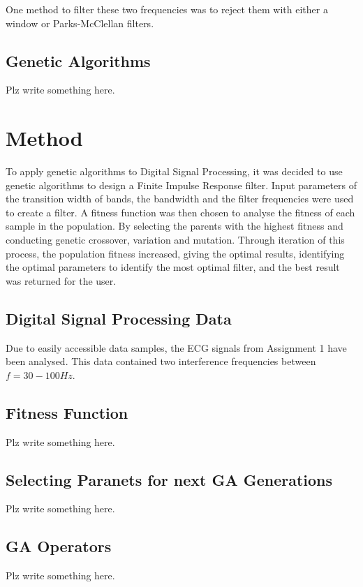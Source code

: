 \documentclass[a4paper, 11pt]{article}
\begin{document}
        One method to filter these two frequencies was to reject them with either a window or Parks-McClellan filters.
        
    \subsection{Genetic Algorithms}\label{sec:bg_sub2}
        Plz write something here.

\section{Method}\label{sec:meth}
    To apply genetic algorithms to Digital Signal Processing, it was decided to use genetic algorithms to design a 
    Finite Impulse Response filter. Input parameters of the transition width of bands, the bandwidth
    and the filter frequencies were used to create a filter. A fitness function was then chosen to analyse the fitness
    of each sample in the population. By selecting the parents with the highest fitness and conducting genetic crossover,
    variation and mutation. Through iteration of this process, the population fitness increased, giving the optimal results, 
    identifying the optimal parameters to identify the most optimal filter, and the best result was returned for the user.

    \subsection{Digital Signal Processing Data}\label{sec:meth_sub1}
        Due to easily accessible data samples, the ECG signals from Assignment 1 have been analysed. This data contained
        two interference frequencies between  $f = 30 - 100Hz$. 


    \subsection{Fitness Function}\label{sec:meth_sub2}
        Plz write something here.

    \subsection{Selecting Paranets for next GA Generations}\label{sec:meth_sub3}
        Plz write something here.

    \subsection{GA Operators}\label{sec:meth_sub4}
        Plz write something here.
\end{document}
